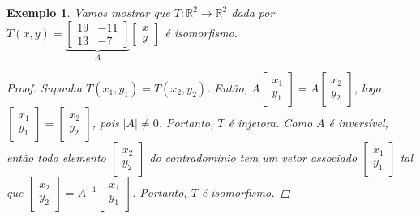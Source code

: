 \documentclass{article}
\newtheorem*{example}{Exemplo}
\begin{document}
\begin{example}
	Vamos mostrar que $T:\mathbb{R}^2\to\mathbb{R}^2$ dada por $T(x,y) = \underbrace{\begin{bmatrix}
	19 & -11 \\
	13 & -7
	\end{bmatrix}}_{A}\begin{bmatrix}
	x\\
	y
	\end{bmatrix}$ é isomorfismo.
	
	\begin{proof}
		Suponha $T(x_1,y_1) = T(x_2, y_2)$. Então, $A\begin{bmatrix}
		x_1\\
		y_1
		\end{bmatrix} = A\begin{bmatrix}
		x_2\\
		y_2
		\end{bmatrix} $, logo $\begin{bmatrix}
		x_1\\
		y_1
		\end{bmatrix} = \begin{bmatrix}
		x_2\\
		y_2
		\end{bmatrix}$, pois $|A|\neq 0$. Portanto, $T$ é injetora. Como $A$ é inversível, então todo elemento $\begin{bmatrix}
		x_2\\
		y_2
		\end{bmatrix}$ do contradomínio tem um vetor associado $\begin{bmatrix}
		x_1\\
		y_1
		\end{bmatrix}$ tal que $\begin{bmatrix}
		x_2\\
		y_2
		\end{bmatrix} = A^{-1}\begin{bmatrix}
		x_1\\
		y_1
		\end{bmatrix}$. Portanto, $T$ é isomorfismo.
	\end{proof}
	
	
\end{example}
\end{document}
